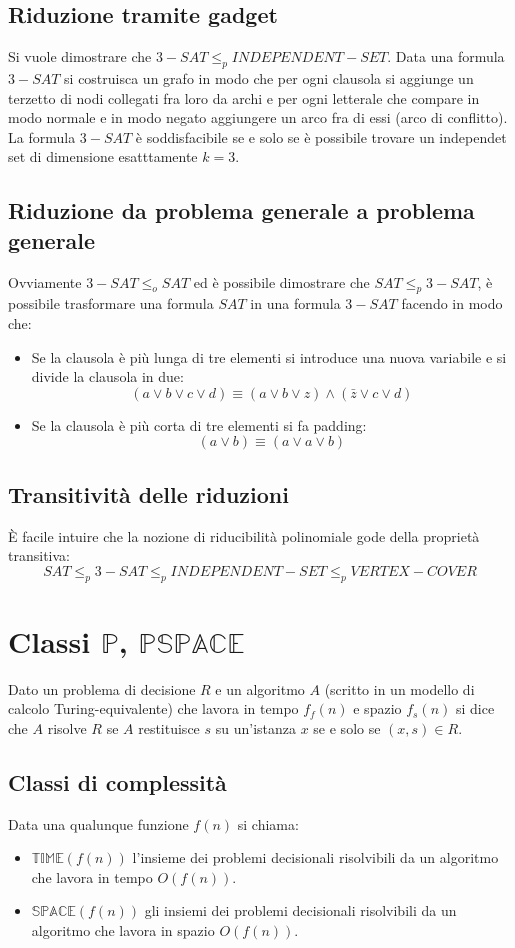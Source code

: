 \subsection{Riduzione tramite gadget}
Si vuole dimostrare che $3-SAT\le_p INDEPENDENT-SET$. Data una formula $3-SAT$ si costruisca un grafo in modo che per ogni clausola si aggiunge un terzetto di nodi collegati fra loro
da archi e per ogni letterale che compare in modo normale e in modo negato aggiungere un arco fra di essi (arco di conflitto). La formula $3-SAT$ \`e soddisfacibile se e solo se \`e
possibile trovare un independet set di dimensione esatttamente $k=3$.
\subsection{Riduzione da problema generale a problema generale}
Ovviamente $3-SAT\le_o SAT$ ed \`e possibile dimostrare che $SAT\le_p 3-SAT$, \`e possibile trasformare una formula $SAT$ in una formula $3-SAT$ facendo in modo che:
\begin{itemize}
	\item Se la clausola \`e pi\`u lunga di tre elementi si introduce una nuova variabile e si divide la clausola in due:
		$$(a\lor b\lor c\lor d)\equiv (a\lor b\lor z)\land(\bar{z}\lor c\lor d)$$
	\item Se la clausola \`e pi\`u corta di tre elementi si fa padding:
		$$(a\lor b)\equiv (a\lor a\lor b)$$
\end{itemize}
\subsection{Transitivit\`a delle riduzioni}
\`E facile intuire che la nozione di riducibilit\`a polinomiale gode della propriet\`a transitiva:
$$SAT \le_p 3-SAT \le_p INDEPENDENT-SET \le_p VERTEX-COVER$$
\section{Classi $\mathbf{\mathbb{P}}$, $\mathbf{\mathbb{PSPACE}}$}
Dato un problema di decisione $R$ e un algoritmo $A$ (scritto in un modello di calcolo Turing-equivalente) che lavora in tempo $f_f(n)$ e spazio $f_s(n)$ si dice che $A$ risolve $R$ se
$A$ restituisce $s$ su un'istanza $x$ se e solo se $(x, s)\in R$. 
\subsection{Classi di complessit\`a}
Data una qualunque funzione $f(n)$ si chiama:
\begin{itemize}
	\item $\mathbb{TIME}(f(n))$ l'insieme dei problemi decisionali risolvibili da un algoritmo che lavora in tempo $O(f(n))$.
	\item $\mathbb{SPACE}(f(n))$ gli insiemi dei problemi decisionali risolvibili da un algoritmo che lavora in spazio $O(f(n))$.
\end{itemize}
